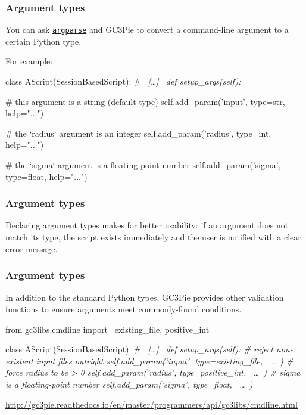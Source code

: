 \documentclass[english,serif,mathserif,xcolor=pdftex,dvipsnames,table]{beamer}
\begin{document}
\begin{frame}[fragile]
  \frametitle{Argument types}

  You can ask
  \href{https://docs.python.org/2/howto/argparse.html}{\texttt{argparse}}
  and GC3Pie to convert a command-line argument to a certain Python type.

  \+ For example:
\begin{python}
class AScript(SessionBasedScript):
  # ~\em [\ldots]~
  def setup_args(self):

    # this argument is a string (default type)
    self.add_param('input',  type=str,   help="...")

    # the `radius` argument is an integer
    self.add_param('radius', type=int,   help="...")

    # the `sigma` argument is a floating-point number
    self.add_param('sigma',  type=float, help="...")
\end{python}
\end{frame}


\begin{frame}[fragile]
  \frametitle{Argument types}

  Declaring argument types makes for better usability: if an argument
  does not match its type, the script exists immediately and the user
  is notified with a clear error message.

  \+
\end{frame}


\begin{frame}[fragile]
  \frametitle{Argument types}\small

  In addition to the standard Python types, GC3Pie provides other
  validation functions to ensure arguments meet commonly-found
  conditions.

\begin{python}
from gc3libs.cmdline import \
  existing_file, positive_int

class AScript(SessionBasedScript):
  # ~\em [\ldots]~
  def setup_args(self):
    # reject non-existent input files outright
    self.add_param('input',  type=existing_file, ~\ldots~)
    # force radius to be > 0
    self.add_param('radius', type=positive_int, ~\ldots~)
    #  sigma is a floating-point number
    self.add_param('sigma',  type=float, ~\ldots~)
\end{python}

\begin{references}
  \tiny\url{http://gc3pie.readthedocs.io/en/master/programmers/api/gc3libs/cmdline.html}
\end{references}
\end{frame}
\end{document}
